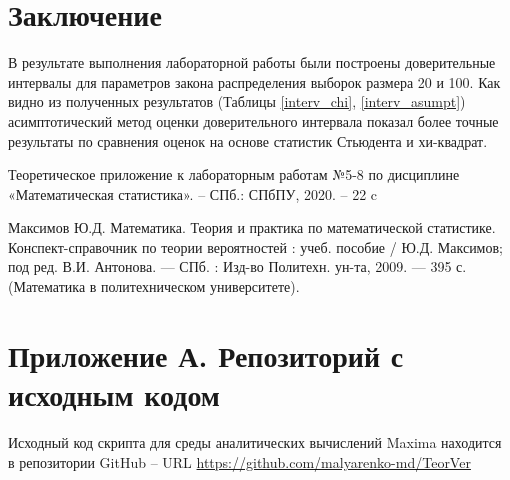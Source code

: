 \documentclass[12pt]{article}
\begin{document}
\begin{flushleft}
\newpage

\section*{Заключение}

	В результате выполнения лабораторной работы были построены доверительные интервалы для параметров закона распределения выборок размера 20 и 100. Как видно из полученных результатов (Таблицы \ref{interv_chi}, \ref{interv_asumpt}) асимптотический метод оценки доверительного интервала показал более точные результаты по сравнения оценок на основе статистик Стьюдента и хи-квадрат.

\newpage

\begin{thebibliography}{9}

    Теоретическое приложение к лабораторным работам №5-8 по дисциплине «Математическая статистика». -- СПб.: СПбПУ, 2020. -- 22 c 
    
    Максимов Ю.Д. Математика. Теория и практика по математической статистике. Конспект-справочник по теории вероятностей : учеб. пособие / Ю.Д. Максимов; под ред. В.И. Антонова. — СПб. : Изд-во Политехн. ун-та, 2009. — 395 с. (Математика в политехническом университете).

\end{thebibliography}

\newpage

\section*{Приложение А. Репозиторий с исходным кодом}

Исходный код скрипта для среды аналитических вычислений Maxima находится в репозитории GitHub -- URL \url{https://github.com/malyarenko-md/TeorVer}

\end{flushleft}
\end{document}
